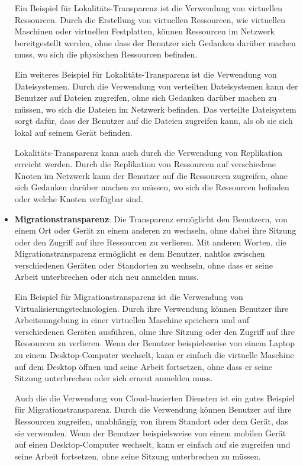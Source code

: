 \begin{itemize}
Ein Beispiel für Lokalitäts-Transparenz ist die Verwendung von virtuellen Ressourcen. Durch die Erstellung von virtuellen Ressourcen, wie virtuellen Maschinen oder virtuellen Festplatten, können Ressourcen im Netzwerk bereitgestellt werden, ohne dass der Benutzer sich Gedanken darüber machen muss, wo sich die physischen Ressourcen befinden.

Ein weiteres Beispiel für Lokalitäts-Transparenz ist die Verwendung von Dateisystemen. Durch die Verwendung von verteilten Dateisystemen kann der Benutzer auf Dateien zugreifen, ohne sich Gedanken darüber machen zu müssen, wo sich die Dateien im Netzwerk befinden. Das verteilte Dateisystem sorgt dafür, dass der Benutzer auf die Dateien zugreifen kann, als ob sie sich lokal auf seinem Gerät befinden.

Lokalitäts-Transparenz kann auch durch die Verwendung von Replikation erreicht werden. Durch die Replikation von Ressourcen auf verschiedene Knoten im Netzwerk kann der Benutzer auf die Ressourcen zugreifen, ohne sich Gedanken darüber machen zu müssen, wo sich die Ressourcen befinden oder welche Knoten verfügbar sind. 

\item \textbf{Migrationstransparenz}: Die Transparenz ermöglicht den Benutzern, von einem Ort oder Gerät zu einem anderen zu wechseln, ohne dabei ihre Sitzung oder den Zugriff auf ihre Ressourcen zu verlieren. Mit anderen Worten, die Migrationstransparenz ermöglicht es dem Benutzer, nahtlos zwischen verschiedenen Geräten oder Standorten zu wechseln, ohne dass er seine Arbeit unterbrechen oder sich neu anmelden muss.

Ein Beispiel für Migrationstransparenz ist die Verwendung von Virtualisierungstechnologien. Durch ihre Verwendung können Benutzer ihre Arbeitsumgebung in einer virtuellen Maschine speichern und auf verschiedenen Geräten ausführen, ohne ihre Sitzung oder den Zugriff auf ihre Ressourcen zu verlieren. Wenn der Benutzer beispielsweise von einem Laptop zu einem Desktop-Computer wechselt, kann er einfach die virtuelle Maschine auf dem Desktop öffnen und seine Arbeit fortsetzen, ohne dass er seine Sitzung unterbrechen oder sich erneut anmelden muss.

Auch die die Verwendung von Cloud-basierten Diensten ist ein gutes Beispiel für Migrationstransparenz. Durch die Verwendung  können Benutzer auf ihre Ressourcen zugreifen, unabhängig von ihrem Standort oder dem Gerät, das sie verwenden. Wenn der Benutzer beispielsweise von einem mobilen Gerät auf einen Desktop-Computer wechselt, kann er einfach auf sie zugreifen und seine Arbeit fortsetzen, ohne seine Sitzung unterbrechen zu müssen.


\end{itemize}

